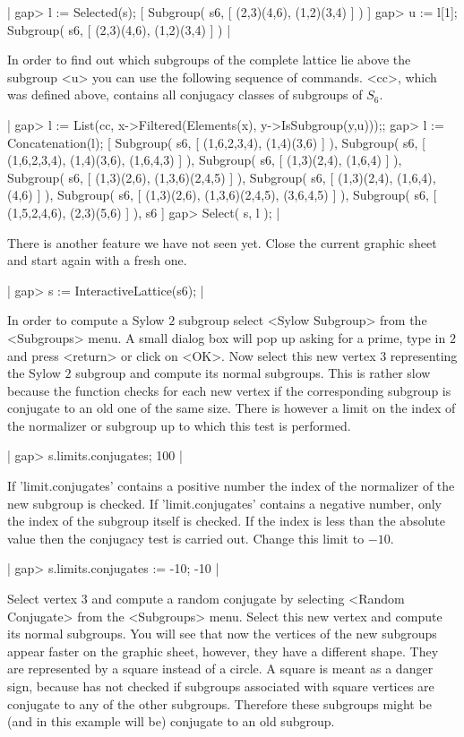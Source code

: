 |    gap> l := Selected(s);
    [ Subgroup( s6, [ (2,3)(4,6), (1,2)(3,4) ] ) ]
    gap> u := l[1];
    Subgroup( s6, [ (2,3)(4,6), (1,2)(3,4) ] ) |

In order  to find out which subgroups  of the complete lattice  lie above
the subgroup <u> you can  use the following  sequence of {\GAP} commands.
<cc>,   which  was  defined above,   contains   all conjugacy  classes of
subgroups of $S_6$.

|    gap> l := List(cc, x->Filtered(Elements(x), y->IsSubgroup(y,u)));;
    gap> l := Concatenation(l);
    [ Subgroup( s6, [ (1,6,2,3,4), (1,4)(3,6) ] ), 
      Subgroup( s6, [ (1,6,2,3,4), (1,4)(3,6), (1,6,4,3) ] ), 
      Subgroup( s6, [ (1,3)(2,4), (1,6,4) ] ), 
      Subgroup( s6, [ (1,3)(2,6), (1,3,6)(2,4,5) ] ), 
      Subgroup( s6, [ (1,3)(2,4), (1,6,4), (4,6) ] ), 
      Subgroup( s6, [ (1,3)(2,6), (1,3,6)(2,4,5), (3,6,4,5) ] ), 
      Subgroup( s6, [ (1,5,2,4,6), (2,3)(5,6) ] ), s6 ]
    gap> Select( s, l ); |

There is another feature we have not seen yet.  Close the current graphic
sheet and start again with a fresh one.

|    gap> s := InteractiveLattice(s6); |

In order to compute a Sylow $2$ subgroup select <Sylow Subgroup> from the
<Subgroups> menu.   A small dialog box  will  pop up asking  for a prime,
type in  $2$ and press <return> or  click on <OK>.   Now select  this new
vertex $3$   representing the Sylow $2$  subgroup  and compute its normal
subgroups.  This is rather slow because the  function checks for each new
vertex if the corresponding  subgroup is conjugate to  an old one  of the
same size.  There  is however a  limit on the  index of the normalizer or
subgroup up to which this test is performed.

|    gap> s.limits.conjugates;
    100 |

If  'limit.conjugates' contains a   positive  number  the index  of   the
normalizer of the new subgroup is checked. If 'limit.conjugates' contains
a negative number, only the index of the  subgroup itself is checked.  If
the index  is less  than the  absolute  value then the conjugacy  test is
carried out.  Change this limit to $-10$.

|    gap> s.limits.conjugates := -10;
    -10 |

Select vertex $3$   and compute a  random conjugate  by selecting <Random
Conjugate> from the <Subgroups> menu.  Select this new vertex and compute
its  normal subgroups.  You will  see  that now  the vertices  of the new
subgroups appear  faster on  the   graphic sheet, however,  they  have  a
different shape.  They are  represented by a square  instead of a circle.
A square  is meant as  a danger sign,  because {\GAP} has not  checked if
subgroups associated  with square vertices  are  conjugate to any  of the
other subgroups.  Therefore these subgroups might be (and in this example
will be) conjugate to an old subgroup.

